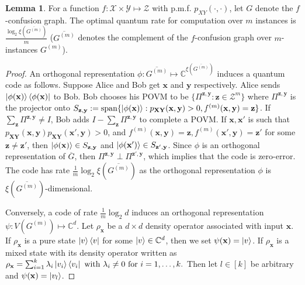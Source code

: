 \documentclass[journal, onecolumn, draftcls]{IEEEtran}
\theoremstyle{definition}
\newtheorem{lemma}{Lemma}
\newcommand{\calX}{\mathcal{X}}
\newcommand{\calY}{\mathcal{Y}}
\newcommand{\calZ}{\mathcal{Z}}
\newcommand{\bfy}{\mathbf{y}}
\newcommand{\bfX}{\mathbf{X}}
\newcommand{\bfY}{\mathbf{Y}}
\newcommand{\bfx}{\mathbf{x}}
\newcommand{\bfz}{\mathbf{z}}
\newcommand{\bbC}{\mathbb{C}}
\newcommand{\meng}[1]{\marginpar{+}{\bf Ruoyu's remark}: {\em #1}}
\newcommand{\aditya}[1]{\marginpar{+}{\bf Aditya's remark}: {\em #1}}
\begin{document}
\begin{lemma}\label{lemma:lemma4}
For a function $f:\calX\times\calY \mapsto\calZ$ with p.m.f. $p_{XY}(\cdot,\cdot)$, let $G$ denote the $f$-confusion graph. The optimal quantum rate for computation over $m$ instances is $\frac{\log_2\xi(\overline{G^{(m)}})}{m}$ ($\overline{G^{(m)}}$ denotes the complement of the $f$-confusion graph over $m$-instances $G^{(m)}$).
\end{lemma}
\begin{proof}
An orthogonal representation $\phi:\overline{G^{(m)}}\mapsto \bbC^{\xi(\overline{G^{(m)}})}$  induces a quantum code as follows. Suppose Alice and Bob get  $\bfx $ and $\bfy$ respectively.  Alice sends $\ket{\phi(\bfx)}\bra{\phi(\bfx)}$ to Bob.  Bob chooses his POVM to be $\{\Pi^{\bfz,\bfy}  :\bfz\in \calZ^m\}$ where $\Pi^{\bfz,\bfy}$ is the projector onto $S_{\bfz,\bfy}:=\text{span}\{\ket{\phi(\bfx)}:p_{\bfX\bfY}(\bfx,\bfy)>0, f^{(m)}(\bfx,\bfy) 
 = \bfz \}$. 
 If $\sum_{\bfz}\Pi^{\bfz,\bfy}\ne I$, Bob adds $I-\sum_{\bfz}\Pi^{\bfz,\bfy}$ to complete a POVM. If $\bfx,\bfx'$ is such that $p_{\bfX\bfY}(\bfx,\bfy)p_{\bfX\bfY}(\bfx',\bfy)>0$, and $f^{(m)}(\bfx,\bfy)=\bfz,f^{(m)}(\bfx',\bfy)=\bfz'$ for some $\bfz\ne \bfz'$, then $\ket{\phi(\bfx)} \in S_{\bfz,\bfy}$ and $\ket{\phi(\bfx')}\in S_{\bfz',\bfy}$. Since $\phi$ is an orthogonal representation of $\overline{G}$, then  $\Pi^{\bfz,\bfy}\perp\Pi^{\bfz',\bfy}$, which implies that  the code is zero-error.   The code has rate $\frac{1}{m}\log_2\xi(\overline{G^{(m)}})$ as the orthogonal representation $\phi$ is $\xi(\overline{G^{(m)}})$-dimensional.


Conversely, a code   of rate $\frac{1}{m}\log_2d$ induces an orthogonal representation $\psi:V(G^{(m)})\mapsto \bbC^{d}$. Let $\rho_{\bfx}$ be a $d\times d$  density operator associated with input $\bfx$. If $\rho_{\bfx}$ is a pure state $\ket{v}\bra{v}$ for some $\ket{v}\in \bbC^d$, then we set  
 $\psi(\bfx) = \ket{v}$. If $\rho_{\bfx}$ is a mixed state with its density operator written as  
 $\rho_{\bfx} =\sum_{i=1}^k \lambda_i\ket{v_i}\bra{v_i}\text{ with }\lambda_i\ne 0\text{ for }i=1,\dots,k.$
Then let $l\in[k]$ be arbitrary and $\psi(\bfx ) = \ket{v_l}$. 


\end{proof}
\end{document}

